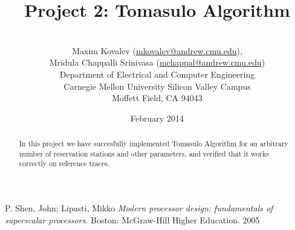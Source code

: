\documentclass{article}
\title{Project 2: Tomasulo Algorithm}
\author{\\
Maxim Kovalev (\href{mailto:mkovalev@andrew.cmu.edu}{mkovalev@andrew.cmu.edu}),\\
Mridula Chappalli Srinivasa (\href{mailto:mchappal@andrew.cmu.edu}{mchappal@andrew.cmu.edu})\\
Department of Electrical and Computer Engineering\\
Carnegie Mellon University Silicon Valley Campus\\
Moffett Field, CA 94043 \\
}
\date{February 2014}
\begin{document}
\maketitle

\begin{abstract}
In this project we have succesfully implemented Tomasulo Algorithm for an arbitrary number of reservation stations and other parameters, and verified that it works correctly on reference traces.
\end{abstract}


\tableofcontents







\begin{thebibliography}{9}

P. Shen, John; Lipasti, Mikko
\emph{Modern processor design: fundamentals of superscalar processors}.
Boston: McGraw-Hill Higher Education.
2005
    
\end{thebibliography}
\end{document}
